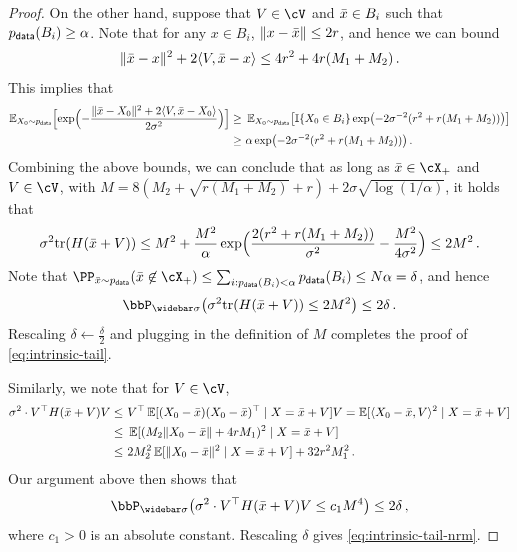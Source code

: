\begin{proof}
On the other hand, suppose that $V\in\cV$ and $\xbar\in B_i$ such that $\pdata(B_i)\geq \alpha$. Note that for any $x\in B_i$, $\nrm{x-\xbar}\leq 2r$, and hence we can bound
\begin{align*}
    \nrm{\xbar-x}^2+2\tri{V,\xbar-x}
    \leq 4r^2+4r(M_1+M_2)\,.
\end{align*}
This implies that
\begin{align*}
    \En_{X_0\sim \pdata}\brk[\Big]{ \exp\prn[\Big]{-\frac{\nrm{\xbar-X_0}^2+2\tri{V,\xbar-X_0}}{2\sigma^2}} }
    \geq&~ \En_{X_0\sim \pdata}\brk*{\indic\crl{X_0\in B_i}\exp\prn*{-2\sigma^{-2}(r^2+r(M_1+M_2))}} \\
    \geq&~ \alpha \exp\prn*{-2\sigma^{-2}(r^2+r(M_1+M_2))}\,.
\end{align*}
Combining the above bounds, we can conclude that as long as $\xbar\in\cX_+$ and $V\in\cV$, with $M=8(M_2+\sqrt{r(M_1+M_2)}+r)+2\sigma\sqrt{\log(1/\alpha)}$,
it holds that
\begin{align*}
    \sigma^2\tr(H(\xbar+V))\leq M^2+\frac{M^2}{\alpha}\exp\prn[\Big]{\frac{2(r^2+r(M_1+M_2))}{\sigma^2}-\frac{M^2}{4\sigma^2}}\leq2M^2\,.
\end{align*}
Note that $\PP_{\xbar\sim \pdata}(\xbar\not\in \cX_+)\leq \sum_{i: \pdata(B_i)<\alpha} \pdata(B_i)\leq N\alpha=\delta$, and hence
\begin{align*}
    \bbP_{\sigbar}\prn*{\sigma^2\tr(H(\xbar+V))\leq 2M^2}\leq 2\delta\,.
\end{align*}
Rescaling $\delta\leftarrow \frac{\delta}{2}$ and plugging in the definition of $M$ completes the proof of \cref{eq:intrinsic-tail}.

Similarly, we note that for $V\in\cV$,
\begin{align*}
    \sigma^2 \cdot V\tp H(\xbar+V) V 
    \leq&~ V\tp \En[(X_0-\xbar)(X_0-\xbar)\tp\mid X=\xbar+V]V 
    =\En[\tri{X_0-\xbar, V}^2\mid X=\xbar+V] \\
    \leq&~ \En[(M_2\nrm{X_0-\xbar}+4rM_1)^2\mid X=\xbar+V] \\
    \leq&~ 2M_2^2\En[\nrm{X_0-\xbar}^2\mid X=\xbar+V]+32r^2M_1^2\,.
\end{align*}
Our argument above then shows that \begin{align*}
    \bbP_{\sigbar}\prn*{\sigma^2 \cdot V\tp H(\xbar+V) V\leq c_1M^4}\leq 2\delta\,,
\end{align*} 
where $c_1>0$ is an absolute constant. Rescaling $\delta$ gives \cref{eq:intrinsic-tail-nrm}.
\end{proof}



